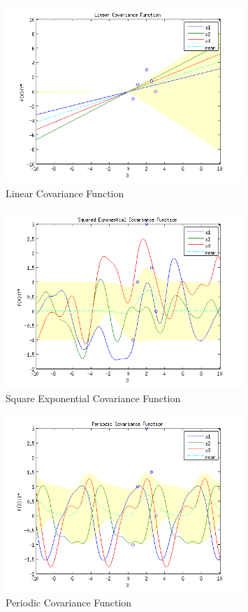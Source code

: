 \documentclass{article}
\begin{document}
\begin{enumerate}[label=(\alph*)]
\begin{figure}[H]
\centering
\includegraphics[width=0.8\textwidth]{1_e_1.png}
\caption{Linear Covariance Function}
\label{fig:1e1}
\end{figure}
\begin{figure}[H]
\centering
\includegraphics[width=0.8\textwidth]{1_e_2.png}
\caption{Square Exponential Covariance Function}
\label{fig:1e2}
\end{figure}
\begin{figure}[H]
\centering
\includegraphics[width=0.8\textwidth]{1_e_3.png}
\caption{Periodic Covariance Function}
\label{fig:1e3}
\end{figure}


\end{enumerate}
\end{document}
